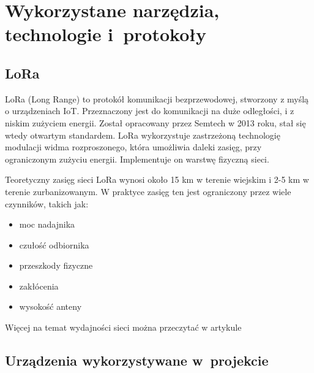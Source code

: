 
\chapter{Wykorzystane narzędzia, technologie i~protokoły}

\section{LoRa}
LoRa (Long Range) to protokół komunikacji bezprzewodowej, stworzony z myślą o urządzeniach IoT. Przeznaczony jest do komunikacji na duże odległości, i z niskim zużyciem energii. Został opracowany przez Semtech w 2013 roku, stał się wtedy otwartym standardem. LoRa wykorzystuje zastrzeżoną technologię modulacji widma rozproszonego, która umożliwia daleki zasięg, przy ograniczonym zużyciu energii. Implementuje on warstwę fizyczną sieci.\cite{lora:about}

Teoretyczny zasięg sieci LoRa wynosi około 15 km w terenie wiejskim i 2-5 km w terenie zurbanizowanym. W praktyce zasięg ten jest ograniczony przez wiele czynników, takich jak:
\begin{itemize}
    \item moc nadajnika
    \item czułość odbiornika
    \item przeszkody fizyczne
    \item zakłócenia
    \item wysokość anteny
\end{itemize}
Więcej na temat wydajności sieci można przeczytać w artykule ~\cite{bib:lora-performance}

\section{Urządzenia wykorzystywane w~projekcie}

